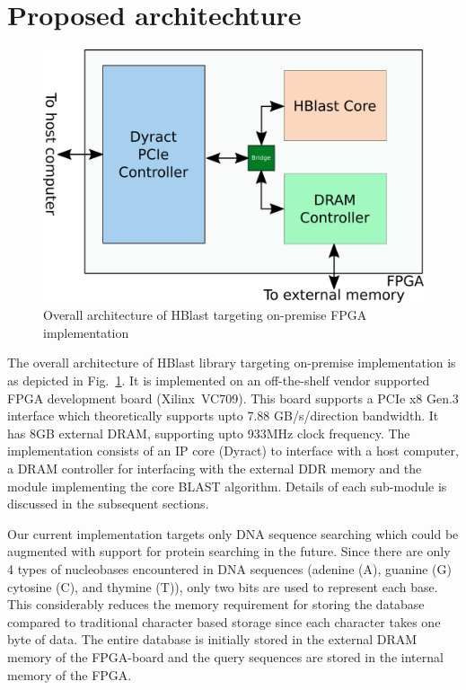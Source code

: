 \section{Proposed architechture}
\label{sec:propesedArch}

\begin{figure}[t!]
\centering
\includegraphics[width=0.9\columnwidth]{Figures/sysArch.pdf}
\caption{Overall architecture of HBlast targeting on-premise FPGA implementation} \label{fig:sysArch}
\end{figure}

The overall architecture of HBlast library targeting on-premise implementation is as depicted in Fig.~\ref{fig:sysArch}.
It is implemented on an off-the-shelf vendor supported FPGA development board (Xilinx~VC709).
This board supports a PCIe x8 Gen.3 interface which theoretically supports upto 7.88 GB/s/direction bandwidth.
It has 8GB external DRAM, supporting upto 933MHz clock frequency.
The implementation consists of an IP core (Dyract) to interface with a host computer, a DRAM controller for interfacing with the external DDR memory and the module implementing the core BLAST algorithm.
Details of each sub-module is discussed in the subsequent sections.

Our current implementation targets only DNA sequence searching which could be augmented with support for protein searching in the future.
Since there are only 4 types of nucleobases encountered in DNA sequences (adenine (A), guanine (G) cytosine (C), and thymine (T)), only two bits are used to represent each base.
This considerably reduces the memory requirement for storing the database compared to traditional character based storage since each character takes one byte of data.
The entire database is initially stored in the external DRAM memory of the FPGA-board and the query sequences are stored in the internal memory of the FPGA.

